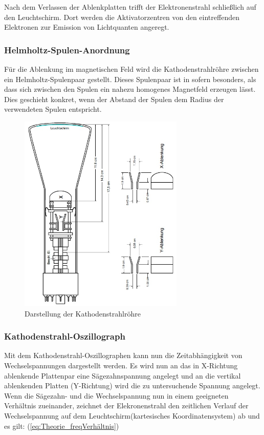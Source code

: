 Nach dem Verlassen der Ablenkplatten trifft der Elektronenstrahl
schließlich auf den Leuchtschirm. Dort werden die Aktivatorzentren von den eintreffenden Elektronen zur Emission von Lichtquanten angeregt.

\subsubsection{Helmholtz-Spulen-Anordnung}

Für die Ablenkung im magnetischen Feld wird die Kathodenstrahlröhre zwischen ein Helmholtz-Spulenpaar gestellt. Dieses Spulenpaar ist in sofern besonders, als dass sich zwischen den Spulen ein nahezu homogenes Magnetfeld erzeugen lässt.\\
Dies geschieht konkret, wenn der Abstand der Spulen dem Radius der verwendeten Spulen entspricht. \\

\begin{figure}[h]
  \centering
  \includegraphics[width=0.7\textwidth]{Grafiken/V501(2)_Abb3.jpg}
  \caption{Darstellung der Kathodenstrahlröhre }
\end{figure}

\subsubsection{Kathodenstrahl-Oszillograph}
Mit dem Kathodenstrahl-Oszillographen kann nun die Zeitabhängigkeit von Wechselspannungen dargestellt werden.  Es wird nun an das in X-Richtung ablenkende Plattenpar eine Sägezahnspannung angelegt und an die vertikal ablenkenden Platten (Y-Richtung) wird die zu untersuchende Spannung angelegt. Wenn die Sägezahn- und die Wechselspannung nun in einem geeigneten Verhältnis zueinander, zeichnet der Elekronenstrahl den zeitlichen Verlauf der Wechselspannung auf dem Leuchtschirm(kartesisches Koordinatensystem) ab und es gilt: (\ref{eq:Theorie_freqVerhältnis})

